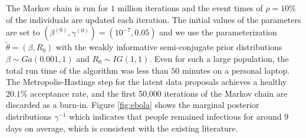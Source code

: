 \documentclass[12pt]{article}
\begin{document}
The Markov chain is run for $1$ million iterations and the event times of $\rho=10\%$ of the individuals are updated each iteration. The initial values of the parameters are set to $(\beta^{(0)}, \gamma^{(0)}) = (10^{-7}, 0.05)$ and we use the parameterization $\tilde{\theta} = (\beta, R_0)$ with the weakly informative semi-conjugate prior distributions $\beta \sim Ga(0.001, 1)$ and $R_0 \sim IG(1,1)$. Even for such a large population, the total run time of the algorithm was less than $50$ minutes on a personal laptop.
The Metropolis-Hastings step for the latent data proposals achieves a healthy $20.1\%$ acceptance rate, and the first 50,000 iterations of the Markov chain are discarded as a burn-in.
Figure \ref{fig:ebola} shows the marginal posterior distributions $\gamma^{-1}$ which indicates that people remained infectious for around $9$ days on average, which is consistent with the existing literature.
\end{document}
